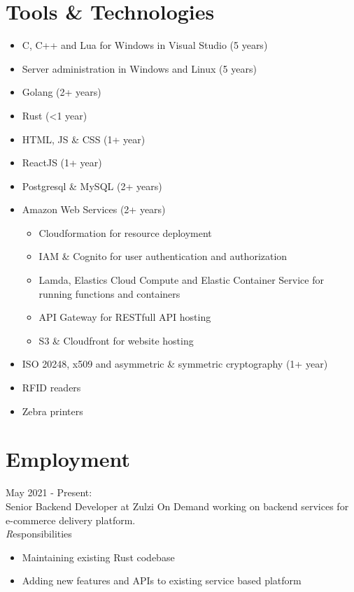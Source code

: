 \documentclass[11pt,a4paper]{article}
\begin{document}
\section*{Tools \& Technologies}
\begin{itemize}

	\item C, C++ and Lua for Windows in Visual Studio (5 years)
	\item Server administration in Windows and Linux (5 years)
	\item Golang (2+ years)
	\item Rust (\textless 1 year)
	\item HTML, JS \& CSS (1+ year)
	\item ReactJS (1+ year)
	\item Postgresql \& MySQL  (2+ years)
	\item Amazon Web Services (2+ years)
	\begin{itemize}
		\item Cloudformation for resource deployment
		\item IAM \& Cognito for user authentication and authorization
		\item Lamda, Elastics Cloud Compute and Elastic Container Service for running functions and containers
		\item API Gateway for RESTfull API hosting
		\item S3 \& Cloudfront for website hosting 
	\end{itemize}
	\item ISO 20248, x509 and asymmetric \& symmetric cryptography (1+ year)
	\item RFID readers
	\item Zebra printers
\end{itemize}

\section*{Employment}                

{\noindent\large May 2021 - Present:}\\
Senior Backend Developer at Zulzi On Demand working on backend services for e-commerce delivery platform.
\\

	{\emph Responsibilities}
	\begin{itemize}
                   \item Maintaining existing Rust codebase 
                   \item Adding new features and APIs to existing service based platform
	\end{itemize}
\end{document}
